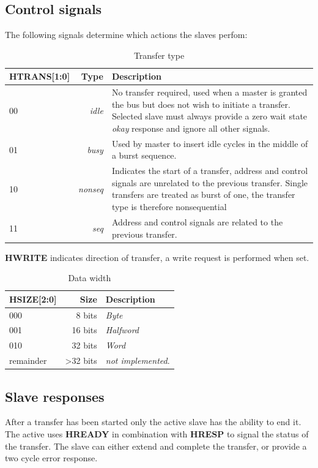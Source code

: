 \newpage
\subsection{Control signals}
The following signals determine which actions the slaves perfom:
\begin{table}[hbt]
  \label{tab:htrans}
  \begin{tabular}{|p{28mm}|r|p{10cm}|} 
  \hline
  \textbf{HTRANS[1:0]} & \textbf{Type} & \textbf{Description} \\
    \hline
  00 & \textit{idle} & No transfer required, used when a master is granted the bus but does not wish to initiate a transfer. Selected slave must always provide a zero wait state \textit{okay} response and ignore all other signals.\\
    \hline
  01 & \textit{busy} & Used by master to insert idle cycles in the middle of a burst sequence. \\
    \hline
  10 & \textit{nonseq} & Indicates the start of a transfer, address and control signals are unrelated to the previous transfer. Single transfers are treated as burst of one, the transfer type is therefore nonsequential\\
    \hline
  11 & \textit{seq} & Address and control signals are related to the previous transfer.\\
\hline
  \end{tabular}
\caption{Transfer type}
\end{table}

\textbf{HWRITE} indicates direction of transfer, a write request is performed when set.

\begin{table}[hbt]
  \label{tab:hsize}
  \begin{tabular}{|p{25mm}|r|p{10cm}|} 
  \hline
  \textbf{HSIZE[2:0]} & \textbf{Size} & \textbf{Description} \\
    \hline
  000 & 8 bits & \textit{Byte}\\
    \hline
  001 & 16 bits & \textit{Halfword} \\
    \hline
  010 & 32 bits & \textit{Word}\\
    \hline
  remainder & >32 bits & \textit{not implemented}.\\
\hline
  \end{tabular}
\caption{Data width}
\end{table}

\subsection{Slave responses}
\label{subsec:slvresp}
After a transfer has been started only the active slave has the ability to end it. The active uses \textbf{HREADY} in combination with \textbf{HRESP} to signal the status of the transfer. The slave can either extend and complete the transfer, or provide a two cycle error response. 

